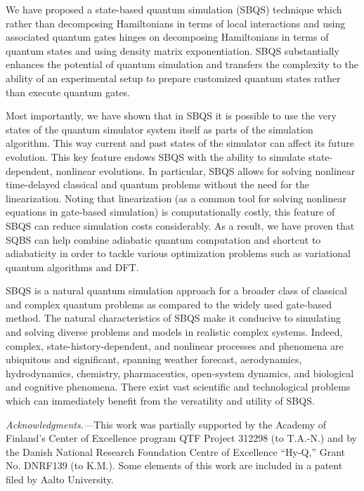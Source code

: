 \documentclass[aps,pra,twocolumn,floatfix,groupedaddress,superscriptaddress,nofootinbib,notitlepage]{revtex4-2}
\begin{document}
We have proposed a state-based quantum simulation (SBQS) technique which rather than decomposing Hamiltonians in terms of local interactions and using associated quantum gates hinges on decomposing Hamiltonians in terms of quantum states and using density matrix exponentiation. SBQS substantially enhances the potential of quantum simulation and transfers the complexity to the ability of an experimental setup to prepare customized quantum states rather than execute quantum gates.

Most importantly, we have shown that in SBQS it is possible to use the very states of the quantum simulator system itself as parts of the simulation algorithm. This way current and past states of the simulator can affect its future evolution. This key feature endows SBQS with the ability to simulate state-dependent, nonlinear evolutions. In particular, SBQS allows for solving nonlinear time-delayed classical and quantum problems without the need for the linearization. Noting that linearization (as a common tool for solving nonlinear equations in gate-based simulation) is computationally costly, this feature of SBQS can reduce simulation costs considerably. As a result, we have proven that SQBS can help combine adiabatic quantum computation and shortcut to adiabaticity in order to tackle various optimization problems such as variational quantum algorithms and DFT.

SBQS is a natural quantum simulation approach for a broader class of classical and complex quantum problems as compared to the widely used gate-based method. The natural characteristics of SBQS make it conducive to simulating and solving diverse problems and models in realistic complex systems. Indeed, complex, state-history-dependent, and nonlinear processes and phenomena are ubiquitous and significant, spanning weather forecast, aerodynamics, hydrodynamics, chemistry, pharmaceutics, open-system dynamics, and biological and cognitive phenomena. There exist vast scientific and technological problems which can immediately benefit from the versatility and utility of SBQS.

\textit{Acknowledgments.---}This work was partially supported by the Academy of Finland's Center of Excellence program QTF Project 312298 (to T.A.-N.) and by the Danish National Research Foundation Centre of Excellence ``Hy-Q,'' Grant No. DNRF139 (to K.M.). Some elements of this work are included in a patent filed by Aalto University.
\end{document}
